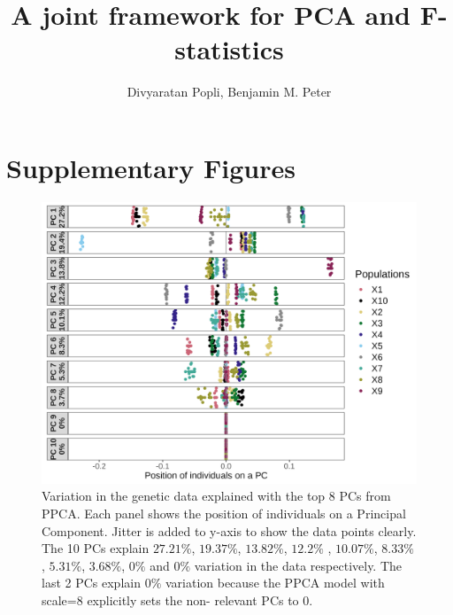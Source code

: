 \documentclass[12pt, letterpaper]{article}
\title{A joint framework for PCA and F-statistics}
\author{Divyaratan Popli, Benjamin M. Peter}
\begin{document}
\maketitle
\section*{Supplementary Figures}
\renewcommand{\figurename}{Fig S}



\begin{figure}[ht!]
    \includegraphics[width=16.5cm]{plots/supplementary/pcplot2.png}
    \centering
    \caption{Variation in the genetic data explained with the top 8 PCs from PPCA. Each panel shows the position of individuals on a Principal Component. Jitter is added to y-axis to show the data points clearly. The 10 PCs explain $27.21\%$, $19.37\%$, $13.82\%$, $12.2\%$ , $10.07\%$,  $8.33\%$,  $5.31\%$,  $3.68\%$, $0\%$ and $0\%$ variation in the data respectively. The last 2 PCs explain $0\%$ variation because the PPCA model with scale=8 explicitly sets the non- relevant PCs to 0.}
    \label{figS1:pc_scale}
\end{figure}
\end{document}
